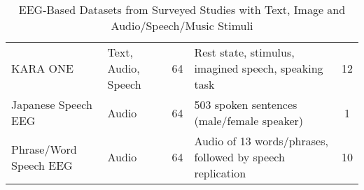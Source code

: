 \begin{table*}[t]
{\begin{tabular}{l l c l c}
        KARA ONE \cite{zhao2015classifying} & Text, Audio, Speech & 64 & Rest state, stimulus, imagined speech, speaking task & 12 \\
        Japanese Speech EEG \cite{mizuno2024investigation} & Audio & 64 & 503 spoken sentences (male/female speaker) & 1 \\
        Phrase/Word Speech EEG \cite{park2024towards} & Audio & 64 & Audio of 13 words/phrases, followed by speech replication & 10 \\
        \bottomrule
    \end{tabular}%
    }
    \caption{EEG-Based Datasets from Surveyed Studies with Text, Image and Audio/Speech/Music Stimuli}
    \label{tab:datasets}
\end{table*}
